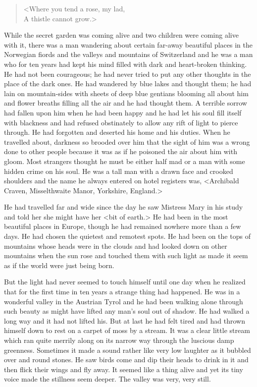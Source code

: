 \begin{verse}
<Where you tend a rose, my lad,\\
A thistle cannot grow.>
\end{verse}

While the secret garden was coming alive and two children were coming alive with it, there was a man wandering about certain far-away beautiful places in the Norwegian fiords and the valleys and mountains of Switzerland and he was a man who for ten years had kept his mind filled with dark and heart-broken thinking. He had not been courageous; he had never tried to put any other thoughts in the place of the dark ones. He had wandered by blue lakes and thought them; he had lain on mountain-sides with sheets of deep blue gentians blooming all about him and flower breaths filling all the air and he had thought them. A terrible sorrow had fallen upon him when he had been happy and he had let his soul fill itself with blackness and had refused obstinately to allow any rift of light to pierce through. He had forgotten and deserted his home and his duties. When he travelled about, darkness so brooded over him that the sight of him was a wrong done to other people because it was as if he poisoned the air about him with gloom. Most strangers thought he must be either half mad or a man with some hidden crime on his soul. He was a tall man with a drawn face and crooked shoulders and the name he always entered on hotel registers was, <Archibald Craven, Misselthwaite Manor, Yorkshire, England.>

He had travelled far and wide since the day he saw Mistress Mary in his study and told her she might have her <bit of earth.> He had been in the most beautiful places in Europe, though he had remained nowhere more than a few days. He had chosen the quietest and remotest spots. He had been on the tops of mountains whose heads were in the clouds and had looked down on other mountains when the sun rose and touched them with such light as made it seem as if the world were just being born.

But the light had never seemed to touch himself until one day when he realized that for the first time in ten years a strange thing had happened. He was in a wonderful valley in the Austrian Tyrol and he had been walking alone through such beauty as might have lifted any man's soul out of shadow. He had walked a long way and it had not lifted his. But at last he had felt tired and had thrown himself down to rest on a carpet of moss by a stream. It was a clear little stream which ran quite merrily along on its narrow way through the luscious damp greenness. Sometimes it made a sound rather like very low laughter as it bubbled over and round stones. He saw birds come and dip their heads to drink in it and then flick their wings and fly away. It seemed like a thing alive and yet its tiny voice made the stillness seem deeper. The valley was very, very still.

